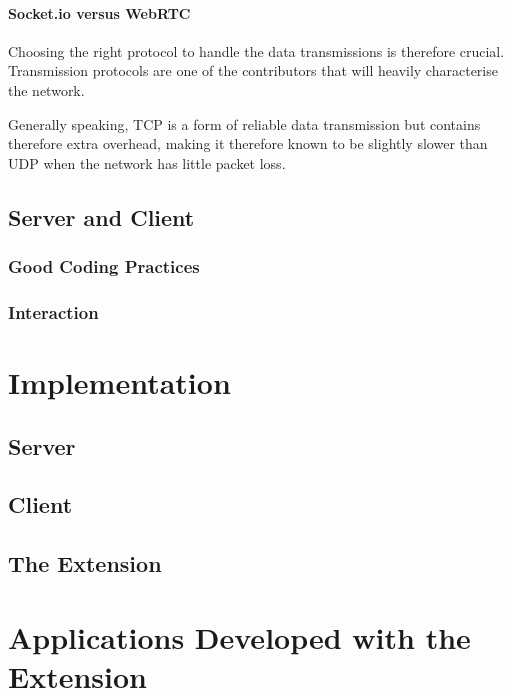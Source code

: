 \documentclass[bsc,frontabs,twoside,singlespacing,parskip,deptreport]{infthesis}     %
\begin{document}
\paragraph*{Socket.io versus WebRTC}
Choosing the right protocol to handle the data transmissions is therefore crucial. Transmission protocols are one of the contributors that will heavily characterise the network.
 
Generally speaking, TCP is a form of reliable data transmission but contains therefore extra overhead, making it therefore known to be slightly slower than UDP when the network has little packet loss.


\subsection{Server and Client}

\subsubsection{Good Coding Practices}
\subsubsection{Interaction}

\section{Implementation}
\subsection{Server}
\subsection{Client}
\subsection{The Extension}
\section{Applications Developed with the Extension}
\end{document}

